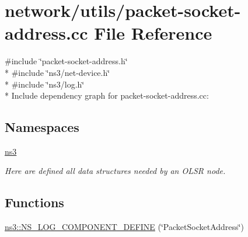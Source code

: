 \hypertarget{packet-socket-address_8cc}{}\section{network/utils/packet-\/socket-\/address.cc File Reference}
\label{packet-socket-address_8cc}
{\ttfamily \#include \char`\"{}packet-\/socket-\/address.\+h\char`\"{}}\\*
{\ttfamily \#include \char`\"{}ns3/net-\/device.\+h\char`\"{}}\\*
{\ttfamily \#include \char`\"{}ns3/log.\+h\char`\"{}}\\*
Include dependency graph for packet-\/socket-\/address.cc\+:
\subsection*{Namespaces}
\begin{DoxyCompactItemize}
\item 
 \hyperlink{namespacens3}{ns3}
\begin{DoxyCompactList}\small\item\em Here are defined all data structures needed by an O\+L\+SR node. \end{DoxyCompactList}\end{DoxyCompactItemize}
\subsection*{Functions}
\begin{DoxyCompactItemize}
\item 
\hyperlink{namespacens3_a72f60c05234fc8e5b016ba42ad627896}{ns3\+::\+N\+S\+\_\+\+L\+O\+G\+\_\+\+C\+O\+M\+P\+O\+N\+E\+N\+T\+\_\+\+D\+E\+F\+I\+NE} (\char`\"{}Packet\+Socket\+Address\char`\"{})
\end{DoxyCompactItemize}
